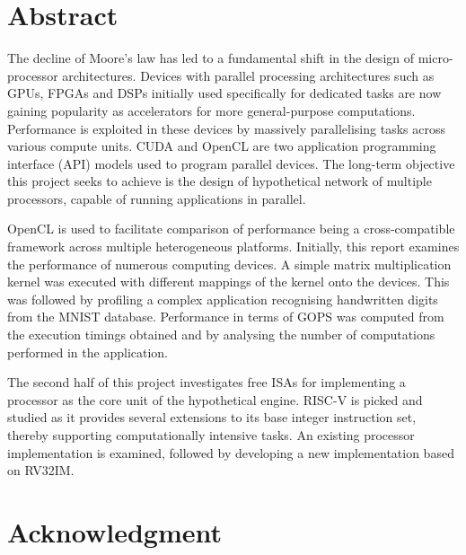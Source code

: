 \chapter*{Abstract} 
\label{ch0i_Abstract}

The decline of Moore's law has led to a fundamental shift in the design of micro-processor architectures. Devices with parallel processing architectures such as GPUs, FPGAs and DSPs initially used specifically for dedicated tasks are now gaining popularity as accelerators for more general-purpose computations. Performance is exploited in these devices by massively parallelising tasks across various compute units. CUDA and OpenCL are two application programming interface (API) models used to program parallel devices. The long-term objective this project seeks to achieve is the design of hypothetical network of multiple processors, capable of running applications in parallel. \newline

OpenCL is used to facilitate comparison of performance being a cross-compatible framework across multiple heterogeneous platforms. Initially, this report examines the performance of numerous computing devices. A simple matrix multiplication kernel was executed with different mappings of the kernel onto the devices. This was followed by profiling a complex application recognising handwritten digits from the MNIST database. Performance in terms of GOPS was computed from the execution timings obtained and by analysing the number of computations performed in the application. \newline

The second half of this project investigates free ISAs for implementing a processor as the core unit of the hypothetical engine. RISC-V is picked and studied as it provides several extensions to its base integer instruction set, thereby supporting computationally intensive tasks. An existing processor implementation is examined, followed by developing a new implementation based on RV32IM.


\chapter*{Acknowledgment} 
\label{ch0ii_Acknowledgement}

